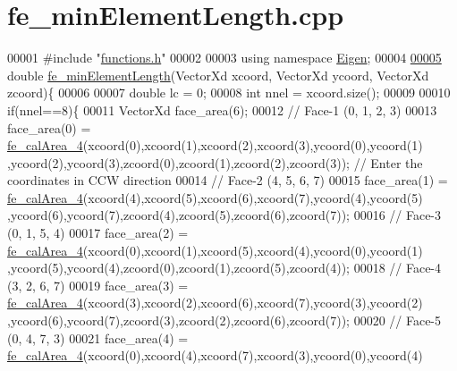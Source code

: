 \hypertarget{fe__min_element_length_8cpp_source}{}\section{fe\+\_\+min\+Element\+Length.\+cpp}
\label{fe__min_element_length_8cpp_source}

\begin{DoxyCode}
00001 \textcolor{preprocessor}{#include "\hyperlink{functions_8h}{functions.h}"}
00002 
00003 \textcolor{keyword}{using namespace }\hyperlink{namespace_eigen}{Eigen};
00004 
\hyperlink{fe__min_element_length_8cpp_a6b04cfa4d2533eed9667ae14f361baa6}{00005} \textcolor{keywordtype}{double} \hyperlink{fe__min_element_length_8cpp_a6b04cfa4d2533eed9667ae14f361baa6}{fe\_minElementLength}(VectorXd xcoord, VectorXd ycoord, VectorXd zcoord)\{
00006 
00007     \textcolor{keywordtype}{double} lc = 0;
00008     \textcolor{keywordtype}{int} nnel = xcoord.size();
00009 
00010     \textcolor{keywordflow}{if}(nnel==8)\{
00011         VectorXd face\_area(6);
00012         \textcolor{comment}{// Face-1 (0, 1, 2, 3)}
00013         face\_area(0) = \hyperlink{functions_8h_ac1306a43db522f3da30471d2a6c48686}{fe\_calArea\_4}(xcoord(0),xcoord(1),xcoord(2),xcoord(3),ycoord(0),ycoord(1)
      ,ycoord(2),ycoord(3),zcoord(0),zcoord(1),zcoord(2),zcoord(3)); \textcolor{comment}{//  Enter the coordinates in CCW direction}
00014         \textcolor{comment}{// Face-2 (4, 5, 6, 7)}
00015         face\_area(1) = \hyperlink{functions_8h_ac1306a43db522f3da30471d2a6c48686}{fe\_calArea\_4}(xcoord(4),xcoord(5),xcoord(6),xcoord(7),ycoord(4),ycoord(5)
      ,ycoord(6),ycoord(7),zcoord(4),zcoord(5),zcoord(6),zcoord(7));
00016         \textcolor{comment}{// Face-3 (0, 1, 5, 4)}
00017         face\_area(2) = \hyperlink{functions_8h_ac1306a43db522f3da30471d2a6c48686}{fe\_calArea\_4}(xcoord(0),xcoord(1),xcoord(5),xcoord(4),ycoord(0),ycoord(1)
      ,ycoord(5),ycoord(4),zcoord(0),zcoord(1),zcoord(5),zcoord(4));
00018         \textcolor{comment}{// Face-4 (3, 2, 6, 7)}
00019         face\_area(3) = \hyperlink{functions_8h_ac1306a43db522f3da30471d2a6c48686}{fe\_calArea\_4}(xcoord(3),xcoord(2),xcoord(6),xcoord(7),ycoord(3),ycoord(2)
      ,ycoord(6),ycoord(7),zcoord(3),zcoord(2),zcoord(6),zcoord(7));
00020         \textcolor{comment}{// Face-5 (0, 4, 7, 3)}
00021         face\_area(4) = \hyperlink{functions_8h_ac1306a43db522f3da30471d2a6c48686}{fe\_calArea\_4}(xcoord(0),xcoord(4),xcoord(7),xcoord(3),ycoord(0),ycoord(4)

\end{DoxyCode}
